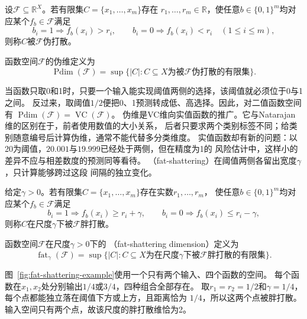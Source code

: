 \begin{definition}[伪打散]
\label{def:pseudo-shattering}
设$\mathcal F\subseteq\mathbb R^X$。若有限集$C=\{x_1,\ldots,x_m\}$存在
$r_1,\ldots,r_m\in\mathbb R$，使任意$b\in\{0,1\}^m$均对应某个$f_b\in\mathcal F$满足
\[
 b_i=1\Rightarrow f_b(x_i)>r_i,\qquad
 b_i=0\Rightarrow f_b(x_i)<r_i\quad(1\leq i\leq m),
\]
则称$C$被$\mathcal F$伪打散。
\end{definition}

\begin{definition}[伪维]
\label{def:pseudo-dimension}
函数空间$\mathcal F$的伪维定义为
\[
 \operatorname{Pdim}(\mathcal F)
 =\sup\{|C|:C\subseteq X\text{为被}\mathcal F\text{伪打散的有限集}\}.
\]
\end{definition}

当函数只取0和1时，只要一个输入能实现阈值两侧的选择，该阈值就必须位于0与1之间。
反过来，取阈值$1/2$便把0、1预测转成低、高选择。因此，对二值函数空间有
$\operatorname{Pdim}(\mathcal F)=\operatorname{VC}(\mathcal F)$。
伪维是VC维向实值函数的推广。它与Natarajan维的区别在于，前者使用数值的大小关系，
后者只要求两个类别标签不同；给类别随意编号后计算伪维，通常不能代替多分类维度。
实值函数却有新的问题：以20为阈值，$20.001$与$19.999$已经处于两侧，但在精度为1的
风险估计中，这样小的差异不应与相差数度的预测同等看待。
（fat-shattering）在阈值两侧各留出宽度$\gamma$，只计算能够跨过这段
间隔的独立变化。

\begin{definition}[胖打散]
\label{def:fat-shattering}
给定$\gamma>0$。若有限集$C=\{x_1,\ldots,x_m\}$存在实数$r_1,\ldots,r_m$，
使任意$b\in\{0,1\}^m$均对应某个$f_b\in\mathcal F$满足
\begin{equation}
 b_i=1\Rightarrow f_b(x_i)\geq r_i+\gamma,\qquad
 b_i=0\Rightarrow f_b(x_i)\leq r_i-\gamma,
 \label{eq:fat-shattering}
\end{equation}
则称$C$在尺度$\gamma$下被$\mathcal F$胖打散。
\end{definition}

\begin{definition}[胖打散维]
\label{def:fat-shattering-dimension}
函数空间$\mathcal F$在尺度$\gamma>0$下的
（fat-shattering dimension）定义为
\[
 \operatorname{fat}_{\gamma}(\mathcal F)
 =\sup\{|C|:C\subseteq X\text{为在尺度}\gamma\text{下被}\mathcal F
 \text{胖打散的有限集}\}.
\]
\end{definition}

图~\ref{fig:fat-shattering-example}使用一个只有两个输入、四个函数的空间。
每个函数在$x_1,x_2$处分别输出$1/4$或$3/4$，四种组合全部存在。
取$r_1=r_2=1/2$和$\gamma=1/4$，每个点都能独立落在阈值下方或上方，且距离恰为
$1/4$，所以这两个点被胖打散。输入空间只有两个点，故该尺度的胖打散维恰为2。

